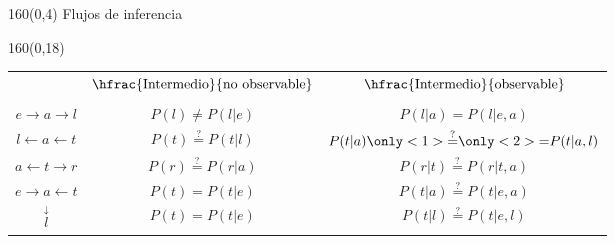 \documentclass[shownotes,aspectratio=169]{beamer}
\begin{document}
\begin{frame}[plain]
\begin{textblock}{160}(0,4)
\centering \Large Flujos de inferencia
\end{textblock}

\begin{textblock}{160}(0,18)
\centering
 \begin{tabular}{c c|c}
 & $\hfrac{\text{Intermedio}}{\text{no observable}}$ &   $\hfrac{\text{Intermedio}}{\text{observable}}$ \\
 & & \\
 $ e \rightarrow a \rightarrow l $    & $P(l) \neq P(l|e)$ & $P(l|a) \overset{\phantom{?}}{=} P(l|e,a)$ \\ 
 $ l \leftarrow a \leftarrow t $      &  $P(t) \overset{?}{=} P(t|l)$  & $P(t|a) \only<1>{\overset{?}{=}}\only<2>{\overset{\phantom{?}}{=}} P(t|a,l)$ \\ 
 $ a \leftarrow t \rightarrow r $     & $P(r) \overset{?}{=} P(r|a)$ & $P(r|t) \overset{?}{=} P(r|t,a)$ \\
 $ e \rightarrow a \leftarrow t $     & $P(t) = P(t|e)$ & $P(t|a) \overset{?}{=} P(t|e,a)$ \\
            $\overset{\downarrow}{l}$  & $P(t) = P(t|e)$ & $P(t|l) \overset{?}{=} P(t|e,l)$
 \end{tabular} 
 \end{textblock}
 
\end{frame}
\end{document}
